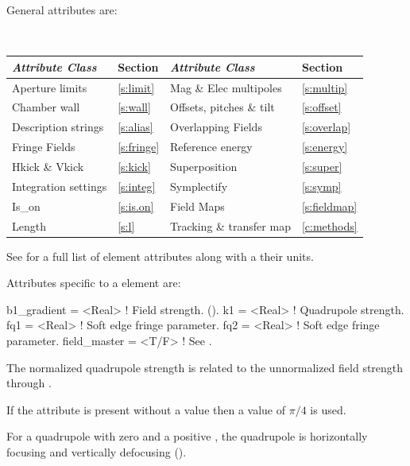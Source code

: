 {General  attributes are:
\begin{center}
\tt
\begin{tabular}{llll} \toprule
  {\sl Attribute Class}      & Section           & {\sl Attribute Class}      & Section            \\ \midrule
  Aperture limits            & \ref{s:limit}     & Mag \& Elec multipoles     & \ref{s:multip}     \\
  Chamber wall               & \ref{s:wall}      & Offsets, pitches \& tilt   & \ref{s:offset}     \\
  Description strings        & \ref{s:alias}     & Overlapping Fields         & \ref{s:overlap}    \\
  Fringe Fields              & \ref{s:fringe}    & Reference energy           & \ref{s:energy}     \\ 
  Hkick \& Vkick             & \ref{s:kick}      & Superposition              & \ref{s:super}      \\
  Integration settings       & \ref{s:integ}     & Symplectify                & \ref{s:symp}       \\
  Is_on                      & \ref{s:is.on}     & Field Maps                 & \ref{s:fieldmap}   \\ 
  Length                     & \ref{s:l}         & Tracking \& transfer map   & \ref{c:methods}    \\ 
  \bottomrule
\end{tabular}
\end{center}
\toffset
See  for a full list of element attributes along with a their units.

Attributes specific to a  element are:
\begin{example}
  b1_gradient  = <Real>    ! Field strength. ().
  k1           = <Real>    ! Quadrupole strength.
  fq1          = <Real>    ! Soft edge fringe parameter.
  fq2          = <Real>    ! Soft edge fringe parameter.
  field_master = <T/F>     ! See .
 \end{example}
The normalized quadrupole  strength is related to the unnormalized  field
strength through .

If the  attribute is present without a value then a value of $\pi/4$
is used.

For a quadrupole with zero  and a positive , the
quadrupole is horizontally focusing and vertically defocusing
().

}
